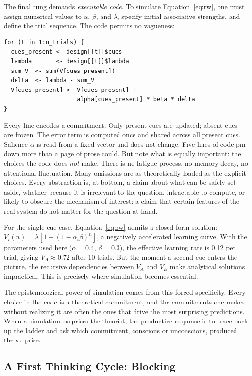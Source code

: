 \documentclass[fleqn,10pt]{wlscirep}
\begin{document}
\begin{linenumbers}
The final rung demands \emph{executable code}. To simulate Equation~\ref{eq:rw}, one must assign numerical values to $\alpha$, $\beta$, and $\lambda$, specify initial associative strengths, and define the trial sequence. The code permits no vagueness:
\begin{verbatim}
for (t in 1:n_trials) {
  cues_present <- design[[t]]$cues
  lambda       <- design[[t]]$lambda
  sum_V  <- sum(V[cues_present])
  delta  <- lambda - sum_V
  V[cues_present] <- V[cues_present] +
                     alpha[cues_present] * beta * delta
}
\end{verbatim}
Every line encodes a commitment. Only present cues are updated; absent cues are frozen. The error term is computed once and shared across all present cues. Salience $\alpha$ is read from a fixed vector and does not change. Five lines of code pin down more than a page of prose could. But note what is equally important: the choices the code does \emph{not} make. There is no fatigue process, no memory decay, no attentional fluctuation. Many omissions are as theoretically loaded as the explicit choices. Every abstraction is, at bottom, a claim about what can be safely set aside, whether because it is irrelevant to the question, intractable to compute, or likely to obscure the mechanism of interest: a claim that certain features of the real system do not matter for the question at hand.

For the single-cue case, Equation~\ref{eq:rw} admits a closed-form solution: $V_i(n) = \lambda[1-(1-\alpha_i\beta)^n]$, a negatively accelerated learning curve. With the parameters used here ($\alpha = 0.4$, $\beta = 0.3$), the effective learning rate is 0.12 per trial, giving $V_A \approx 0.72$ after 10 trials. But the moment a second cue enters the picture, the recursive dependencies between $V_A$ and $V_B$ make analytical solutions impractical. This is precisely where simulation becomes essential.

The epistemological power of simulation comes from this forced specificity. Every choice in the code is a theoretical commitment, and the commitments one makes without realizing it are often the ones that drive the most surprising predictions. When a simulation surprises the theorist, the productive response is to trace back up the ladder and ask which commitment, conscious or unconscious, produced the surprise.

\subsection{A First Thinking Cycle: Blocking}


\end{linenumbers}
\end{document}
